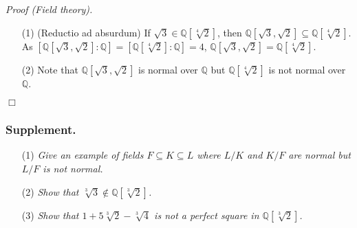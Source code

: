 \documentclass{article}
\begin{document}
\emph{Proof (Field theory).}
\begin{enumerate}
\item[(1)]
  (Reductio ad absurdum)
  If $\sqrt{3} \in \mathbb{Q}[\sqrt[4]{2}]$,
  then $\mathbb{Q}[\sqrt{3},\sqrt{2}] \subseteq \mathbb{Q}[\sqrt[4]{2}]$.
  As $[\mathbb{Q}[\sqrt{3},\sqrt{2}]:\mathbb{Q}] = [\mathbb{Q}[\sqrt[4]{2}]:\mathbb{Q}] = 4$,
  $\mathbb{Q}[\sqrt{3},\sqrt{2}] = \mathbb{Q}[\sqrt[4]{2}]$.

\item[(2)]
  Note that $\mathbb{Q}[\sqrt{3},\sqrt{2}]$ is normal over $\mathbb{Q}$
  but $\mathbb{Q}[\sqrt[4]{2}]$ is not normal over $\mathbb{Q}$.
\end{enumerate}
$\Box$ \\



\subsubsection*{Supplement.}
\begin{enumerate}
\item[(1)]
  \emph{Give an example of fields $F \subseteq K \subseteq L$ where $L/K$ and $K/F$ are normal
  but $L/F$ is not normal.}

\item[(2)]
  \emph{Show that $\sqrt[3]{3} \not\in \mathbb{Q}[\sqrt[3]{2}]$.}

\item[(3)]
  \emph{Show that $1 + 5 \sqrt[3]{2} - \sqrt[3]{4}$ is
  not a perfect square in $\mathbb{Q}[\sqrt[3]{2}]$.} \\\\
\end{enumerate}







\end{document}

